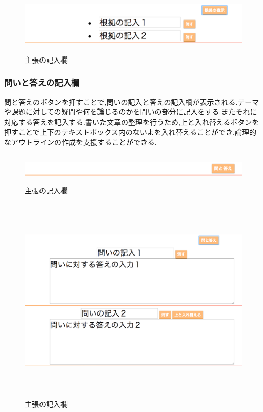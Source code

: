 \documentclass[a4j,12pt]{jarticle}
\begin{document}
\begin{figure}[h]
\begin{center}
 \includegraphics[clip,width=150mm,height=30mm]{03konkuo.png}
\end{center}
 \caption{主張の記入欄}
 \label{fig:k}
\end{figure}

\newpage
\subsubsection{問いと答えの記入欄}
問と答えのボタンを押すことで,問いの記入と答えの記入欄が表示される.テーマや課題に対しての疑問や何を論じるのかを問いの部分に記入をする.またそれに対応する答えを記入する.書いた文章の整理を行うため,上と入れ替えるボタンを押すことで上下のテキストボックス内のないよを入れ替えることができ,論理的なアウトラインの作成を支援することができる.

\begin{figure}[h]
\begin{center}
 \includegraphics[clip,width=150mm,height=15mm]{04qanda.png}
\end{center}
 \caption{主張の記入欄}
 \label{fig:l}
\end{figure}

\begin{figure}[h]
\begin{center}
 \includegraphics[clip,width=150mm,height=100mm]{05qanda.png}
\end{center}
 \caption{主張の記入欄}
 \label{fig:m}
\end{figure}
\newpage
\end{document}
